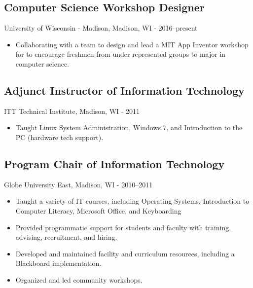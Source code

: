 \documentclass[../main.tex]{subfiles}
\begin{document}
	\subsection*{Computer Science Workshop Designer}
     University of Wisconsin - Madison, Madison, WI - 2016--present
	\begin{itemize}
		\item{Collaborating with a team to design and lead a MIT App Inventor workshop for to encourage freshmen from under represented groups to major in computer science.}
	\end{itemize}


	\subsection*{Adjunct Instructor of Information Technology}
     ITT Technical Institute, Madison, WI - 2011
	\begin{itemize}
		\item{Taught Linux System Administration, Windows 7, and Introduction to the PC (hardware tech support).}
	\end{itemize}

	\subsection*{Program Chair of Information Technology}
     Globe University East, Madison, WI - 2010--2011
	\begin{itemize}
		\item{Taught a variety of IT courses, including Operating Systems, Introduction to Computer Literacy, Microsoft Office, and Keyboarding}
		\item{Provided programmatic support for students and faculty with training, advising, recruitment, and hiring.}
		\item{Developed and maintained facility and curriculum resources, including a Blackboard implementation.}
		\item{Organized and led community workshops.}
	\end{itemize}
\end{document}
